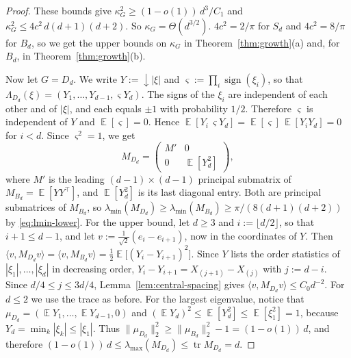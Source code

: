 \documentclass[11pt]{article}
\newcommand{\inner}[2]{\langle #1, #2 \rangle}
\theoremstyle{definition}
\DeclareMathOperator{\EX}{\mathbb{E}}
\begin{document}
\begin{proof}
	These bounds give $\kappa_G^2\ge(1-o(1))\,d^3/C_1$ and $\kappa_G^2\le4c^2\,d(d+1)(d+2)$.
	So $\kappa_G=\Theta(d^{3/2})$. $4c^2=2/\pi$ for $S_d$ and $4c^2=8/\pi$ for $B_d$,
	so we get the upper bounds on $\kappa_G$ in
	Theorem~\ref{thm:growth}(a) and, for $B_d$, in
	Theorem~\ref{thm:growth}(b).
	
	Now let $G=D_d$. We write
	$Y:={\downarrow}|\xi|$ and $\varsigma:=\prod_{i}\operatorname{sign}(\xi_i)$, so that
	$\Lambda_{D_d}(\xi)=(Y_1,\dots,Y_{d-1},\varsigma Y_d)$. The signs of the $\xi_i$ are
	independent of each other and of $|\xi|$, and each equals $\pm1$ with probability $1/2$. Therefore $\varsigma$ is independent of $Y$ and $\EX[\varsigma]=0$. Hence
	$\EX[Y_i\,\varsigma Y_d]=\EX[\varsigma]\,\EX[Y_iY_d]=0$ for $i<d$. Since $\varsigma^2=1$, we
	get
	\[
	M_{D_d}=\begin{pmatrix} M' & 0\\ 0 & \EX[Y_d^2]\end{pmatrix},
	\]
	where $M'$ is the leading $(d-1)\times(d-1)$ principal submatrix of
	$M_{B_d}=\EX[YY^{\!\top}]$, and $\EX[Y_d^2]$ is its last diagonal entry. Both are
	principal submatrices of $M_{B_d}$, so
	$\lambda_{\min}(M_{D_d})\ge\lambda_{\min}(M_{B_d})\ge\pi/(8(d+1)(d+2))$ by
	\eqref{eq:lmin-lower}. For the upper bound, let $d\ge3$ and $i:=\lfloor d/2\rfloor$, so
	that $i+1\le d-1$, and let $v:=\frac1{\sqrt2}(e_i-e_{i+1})$, now in the coordinates of $Y$.
	Then $\inner{v}{M_{D_d}v}=\inner{v}{M_{B_d}v}=\tfrac12\EX\bigl[(Y_i-Y_{i+1})^2\bigr]$. Since $Y$
	lists the order statistics of $|\xi_1|,\dots,|\xi_d|$ in decreasing order,
	$Y_i-Y_{i+1}=X_{(j+1)}-X_{(j)}$ with $j:=d-i$. Since $d/4\le j\le3d/4$,
	Lemma~\ref{lem:central-spacing} gives $\inner{v}{M_{D_d}v}\le C_0d^{-2}$. For $d\le2$ we use the trace as before. For the largest eigenvalue, notice
	that $\mu_{D_d}=(\EX Y_1,\dots,\EX Y_{d-1},0)$ and $(\EX Y_d)^2\le\EX[Y_d^2]\le\EX[\xi_1^2]=1$, because $Y_d=\min_k|\xi_k|\le|\xi_1|$.
	Thus $\|\mu_{D_d}\|_2^2\ge\|\mu_{B_d}\|_2^2-1=(1-o(1))\,d$, and therefore
	$(1-o(1))\,d\le\lambda_{\max}(M_{D_d})\le\operatorname{tr}M_{D_d}=d$.
	

\end{proof}
\end{document}
